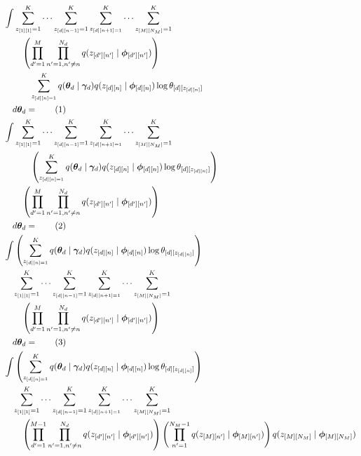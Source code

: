 \documentclass[12pt]{article}
\newcommand\numberthis{\addtocounter{equation}{1}\tag{\theequation}}
\begin{document}
\begin{align*}
    &\int
    \sum_{z_{[1][1]}=1}^{K} \cdots \sum_{z_{[d][n-1]}=1}^{K}
    \sum_{z_{[d][n+1]=1}}^{K} \cdots \sum_{z_{[M][N_{M}]}=1}^{K}\\*
    &\quad\quad \left(\prod_{d'=1}^{M}\prod_{n'=1, n'\neq n}^{N_{d}}
    q(z_{[d'][n']} \mid
    \bm{\phi}_{[d'][n']})\right) \\*
    &\quad\quad\quad\sum_{z_{[d][n]=1}}^{K}
    q(\bm{\theta}_{d} \mid \bm{\gamma}_{d}) q(z_{[d][n]}
    \mid \bm{\phi}_{[d][n]})\log \theta_{[d][z_{[d][n]}]}\\*
    &\quad d\bm{\theta}_{d} = \numberthis \\
    &\int
    \sum_{z_{[1][1]}=1}^{K} \cdots \sum_{z_{[d][n-1]}=1}^{K}
    \sum_{z_{[d][n+1]=1}}^{K} \cdots \sum_{z_{[M][N_{M}]}=1}^{K}\\*
    &\quad\quad\quad\left(\sum_{z_{[d][n]=1}}^{K}
    q(\bm{\theta}_{d} \mid \bm{\gamma}_{d}) q(z_{[d][n]}
    \mid \bm{\phi}_{[d][n]})\log \theta_{[d][z_{[d][n]}]}\right)\\*
    &\quad\quad \left(\prod_{d'=1}^{M}\prod_{n'=1, n'\neq n}^{N_{d}}
    q(z_{[d'][n']} \mid
    \bm{\phi}_{[d'][n']})\right) \\*
    &\quad d\bm{\theta}_{d} = \numberthis \\
    &\int
    \left(\sum_{z_{[d][n]=1}}^{K}
    q(\bm{\theta}_{d} \mid \bm{\gamma}_{d}) q(z_{[d][n]}
    \mid \bm{\phi}_{[d][n]})\log \theta_{[d][z_{[d][n]}]}\right)\\*
    &\quad\sum_{z_{[1][1]}=1}^{K} \cdots \sum_{z_{[d][n-1]}=1}^{K}
    \sum_{z_{[d][n+1]=1}}^{K} \cdots \sum_{z_{[M][N_{M}]}=1}^{K}\\*
    &\quad\quad \left(\prod_{d'=1}^{M}\prod_{n'=1, n'\neq n}^{N_{d}}
    q(z_{[d'][n']} \mid
    \bm{\phi}_{[d'][n']})\right) \\*
    &\quad d\bm{\theta}_{d} = \numberthis \\
    &\int
    \left(\sum_{z_{[d][n]=1}}^{K}
    q(\bm{\theta}_{d} \mid \bm{\gamma}_{d}) q(z_{[d][n]}
    \mid \bm{\phi}_{[d][n]})\log \theta_{[d][z_{[d][n]}]}\right)\\*
    &\quad\sum_{z_{[1][1]}=1}^{K} \cdots \sum_{z_{[d][n-1]}=1}^{K}
    \sum_{z_{[d][n+1]=1}}^{K} \cdots \sum_{z_{[M][N_{M}]}=1}^{K}\\*
    &\quad\quad \left(\prod_{d'=1}^{M-1}\prod_{n'=1, n'\neq n}^{N_{d}}
    q(z_{[d'][n']} \mid \bm{\phi}_{[d'][n']})\right)
    \left(\prod_{n'=1}^{N_{M}-1}q(z_{[M][n']} \mid \bm{\phi}_{[M][n']})\right)
    q(z_{[M][N_{M}]} \mid \bm{\phi}_{[M][N_{M}]}) \\*

\end{align*}
\end{document}
